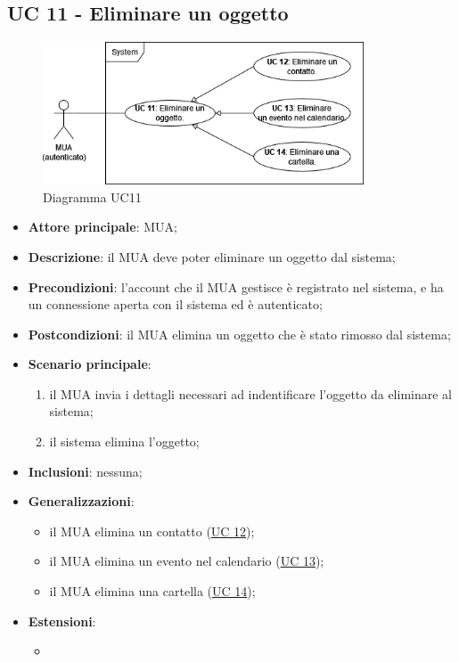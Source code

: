 \subsection{UC 11 - Eliminare un oggetto} \label{sec:UC3}
    \begin{figure}[h]
        \includegraphics[width=0.85\textwidth]{sections/uc_imgs/UC11.png}
        \centering
        \caption{Diagramma UC11 }
    \end{figure}
    \begin{itemize}
        \item \textbf{Attore principale}: MUA;
        \item \textbf{Descrizione}: il MUA deve poter eliminare un oggetto dal sistema;
        \item \textbf{Precondizioni}: l’account che il MUA gestisce è registrato nel sistema, e ha un connessione aperta con il sistema ed è autenticato;
        \item \textbf{Postcondizioni}: il MUA elimina un oggetto che è stato rimosso dal sistema;
        \item \textbf{Scenario principale}:
            \begin{enumerate}
                \item il MUA invia i dettagli necessari ad indentificare l'oggetto da eliminare al sistema;
                \item il sistema elimina l'oggetto;
            \end{enumerate}
        \item \textbf{Inclusioni}: nessuna;
        \item \textbf{Generalizzazioni}:
            \begin{itemize}
                \item il MUA elimina un contatto (\hyperref[sec:UC12]{UC 12});
                \item il MUA elimina un evento nel calendario (\hyperref[sec:UC13]{UC 13});
                \item il MUA elimina una cartella (\hyperref[sec:UC14]{UC 14});
            \end{itemize}
        \item \textbf{Estensioni}: 
        \begin{itemize}
            \item 
        \end{itemize}
    \end{itemize}

